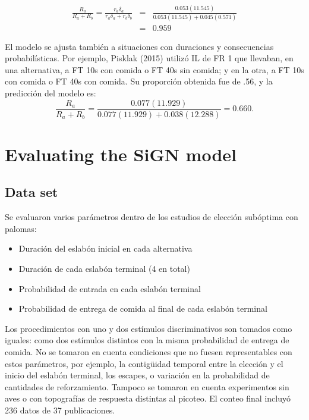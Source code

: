 \documentclass[a4paper,12pt]{article}
\begin{document}
\begin{eqnarray*}
    \frac{
        R_a
    }{
        R_a+R_b
    } = 
    \frac{
        r_a \delta_a
    }{
        r_a \delta_a + r_b \delta_b
    } &=&
    \frac{
        0.053(11.545)
    }{
        0.053(11.545) + 0.045(0.571)
    }\\
        &=& 0.959
\end{eqnarray*}

El modelo se ajusta también a situaciones con duraciones y consecuencias probabilísticas.
Por ejemplo, Pisklak (2015) utilizó IL de FR 1 que llevaban, en una alternativa, a FT 10s con comida o FT 40s sin comida; y en la otra, a FT 10s con comida o FT 40s con comida. Su proporción obtenida fue de .56, y la predicción del modelo es:
\[
    \frac{R_a}{R_a + R_b} =
    \frac{
        0.077(11.929)
    }{
        0.077(11.929) + 0.038(12.288)
    } = 
    0.660
.\]

\section{Evaluating the SiGN model}

\subsection{Data set}

Se evaluaron varios parámetros dentro de los estudios de elección subóptima con palomas:
\begin{itemize}
    \item Duración del eslabón inicial en cada alternativa
    \item Duración de cada eslabón terminal (4 en total)
    \item Probabilidad de entrada en cada eslabón terminal
    \item Probabilidad de entrega de comida al final de cada eslabón terminal
\end{itemize}
Los procedimientos con uno y dos estímulos discriminativos son tomados como iguales: como dos estímulos distintos con la misma probabilidad de entrega de comida.
No se tomaron en cuenta condiciones que no fuesen representables con estos parámetros, por ejemplo, la contigüidad temporal entre la elección y el inicio del eslabón terminal, los escapes, o variación en la probabilidad de cantidades de reforzamiento.
Tampoco se tomaron en cuenta experimentos sin aves o con topografías de respuesta distintas al picoteo.
El conteo final incluyó 236 datos de 37 publicaciones.
\end{document}

